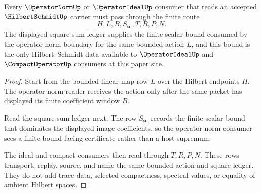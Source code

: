 \begin{theorem}
\label{thm:hilbert-schmidt-operator-norm-bound}
Every $\OperatorNormUp$ or $\OperatorIdealUp$ consumer that reads an accepted $\HilbertSchmidtUp$ carrier must pass through the finite route
$$
H,L,B,S_{\mathrm{sq}},T,R,P,N .
$$
The displayed square-sum ledger supplies the finite scalar bound consumed by the operator-norm boundary for the same bounded action $L$, and this bound is the only Hilbert--Schmidt data available to $\OperatorIdealUp$ and $\CompactOperatorUp$ consumers at this paper site.
\end{theorem}
\begin{proof}
Start from the bounded linear-map row $L$ over the Hilbert endpoints $H$. The operator-norm reader receives the action only after the same packet has displayed its finite coefficient window $B$.

Read the square-sum ledger next. The row $S_{\mathrm{sq}}$ records the finite scalar bound that dominates the displayed image coefficients, so the operator-norm consumer sees a finite bound-facing certificate rather than a host supremum.

The ideal and compact consumers then read through $T,R,P,N$. These rows transport, replay, source, and name the same bounded action and square ledger. They do not add trace data, selected compactness, spectral values, or equality of ambient Hilbert spaces.
\end{proof}




